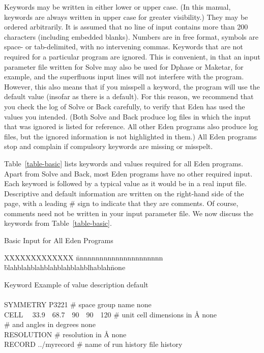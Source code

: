 \documentclass{report}
\begin{document}
\vspace {0.1in}

Keywords may be written in either lower or upper case.  (In this manual, 
keywords are always written in upper case for greater visibility.)
They may be ordered arbitrarily.  It is assumed that no line of input
contains more than 200 characters (including embedded blanks).
Numbers are in free format, symbols are space- or tab-delimited, with no 
intervening commas. 
Keywords that are not required for a particular program are ignored.  
This is convenient, in that an input parameter file written for 
Solve may also be used for Dphase or 
Maketar, for example, and the superfluous input lines 
will not interfere with the program.
However, this also means that if you misspell a keyword, the program will
use the default value (insofar as there is a default).
For this reason, we recommend that you check the log of  
Solve or Back carefully, to verify that Eden has
used the values you intended.  (Both Solve and Back 
produce log files in which the input that was ignored is listed for reference.  
All other Eden programs also produce log files, but the ignored information
is not highlighted in them.)  All Eden programs stop and complain if
compulsory keywords are missing or misspelt.

\vspace {0.1in}

Table~\ref{table-basic} lists keywords and values required for 
all Eden programs.
Apart from Solve and Back, most Eden programs have 
no other required input.  
Each keyword is followed by a typical value as it would be in a real input
file.  Descriptive and default information are written on the right-hand side 
of the page,  with a leading \# sign to indicate that they are comments.
Of course, comments need not be written in your input parameter file.
We now discuss the keywords from Table~\ref{table-basic}.

\begin{table} [htb]
\caption {\large Basic Input for All Eden Programs}
\label{table-basic}

\begin{tabbing}
XXXXXXXXXXXXX \= nnnnnnnnnnnnnnnnnnnnnn \= 
blahblahblahblahblahblahblhablah\= none \kill

Keyword \> Example of value \> description \> default \\
\\
SYMMETRY \> P3221 \> \# space group name \>  none \\
CELL ~~33.9~~68.7~~90~~90~~120 \> \# unit cell dimensions in \AA \> none \\
\> \> \# and angles in degrees \> none \\
RESOLUTION  \> \# resolution in \AA  \> none \\
RECORD \> ../myrecord \> \# name of run history file \> history \\
\\

\end{tabbing} 
\end{table}
\end{document}

